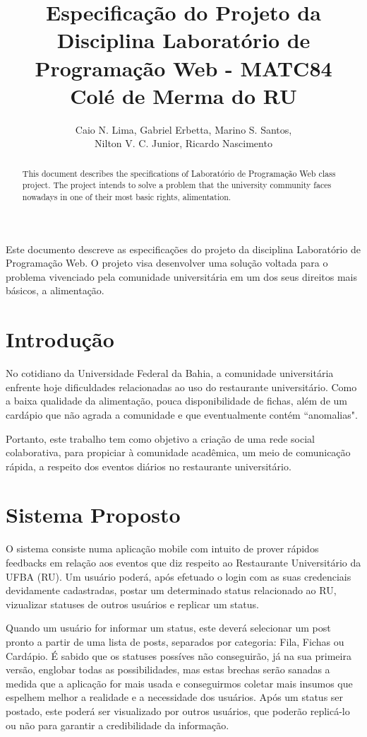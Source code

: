 \documentclass[12pt]{article}
\title{Especificação do Projeto da Disciplina Laboratório de Programação Web - MATC84\\ Colé de Merma do RU}
\author{Caio N. Lima\inst{1}, Gabriel Erbetta\inst{1}, Marino S. Santos\inst{1}, \\
  Nilton V. C. Junior\inst{1},  Ricardo Nascimento\inst{1}}
\begin{document}
\maketitle

\begin{abstract}
  This document describes the specifications of Laboratório de Programação Web class project.
  The project intends to solve a problem that the university community faces nowadays
  in one of their most basic rights, alimentation.
\end{abstract}

\begin{resumo}
  Este documento descreve as especificações do projeto da disciplina Laboratório
  de Programação Web. O projeto visa desenvolver uma solução voltada para o problema
  vivenciado pela comunidade universitária em um dos seus direitos mais básicos, a alimentação.
\end{resumo}


\section{Introdução}

No cotidiano da Universidade Federal da Bahia, a comunidade universitária
enfrente hoje dificuldades relacionadas ao
uso do restaurante universitário. Como a baixa qualidade da alimentação,
pouca disponibilidade de fichas, além de um cardápio que não agrada a comunidade
e que eventualmente contém ``anomalias".

Portanto, este trabalho tem como objetivo a criação de uma rede social colaborativa,
para propiciar à comunidade acadêmica, um meio de comunicação rápida, a respeito dos
eventos diários no restaurante universitário.



\section{Sistema Proposto} \label{sec:firstpage}

O sistema consiste numa aplicação mobile com intuito de prover rápidos feedbacks em relação
aos eventos que diz respeito ao Restaurante Universitário da UFBA (RU). Um usuário poderá,
após efetuado o login com as suas credenciais devidamente cadastradas, postar um determinado
status relacionado ao RU, vizualizar statuses de outros usuários e replicar um status.

Quando um usuário for informar um status, este deverá selecionar um post pronto a partir de uma lista de posts,
separados por categoria: Fila, Fichas ou Cardápio. É sabido que os statuses possíves não
conseguirão, já na sua primeira versão, englobar todas as possibilidades, mas estas brechas
serão sanadas a medida que a aplicação for mais usada e conseguirmos coletar mais insumos que
espelhem melhor a realidade e a necessidade dos usuários. Após um status ser postado, este poderá
ser visualizado por outros usuários, que poderão replicá-lo ou não para garantir a credibilidade
da informação.
\end{document}
